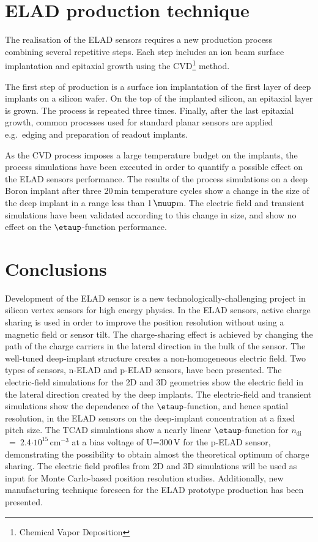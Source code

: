 \documentclass[a4paper,11pt]{article}
\begin{document}
\section{ELAD production technique}
\label{sec:pr}
The realisation of the ELAD sensors requires a new production process combining several repetitive steps.
Each step includes an ion beam surface implantation and epitaxial growth using the CVD\footnote{Chemical Vapor Deposition} method. 

The first step of production is a surface ion implantation of the first layer of deep implants on a silicon wafer.
On the top of the implanted silicon, an epitaxial layer is grown.
The process is repeated three times. 
Finally, after the last epitaxial growth, common processes used for standard planar sensors are applied e.g.\ edging and preparation of readout implants.

As the CVD process imposes a large temperature budget on the implants, the process simulations have been executed in order to quantify a possible effect on the ELAD sensors performance. 
The results of the process simulations on a deep Boron implant after three 20\,min temperature cycles show a change in the size of the deep implant in a range less than 1\,$\muup$m.
The electric field and transient simulations have been validated according to this change in size, and show no effect on the $\etaup$-function performance.


\section{Conclusions}
Development of the ELAD sensor is a new technologically-challenging project in silicon vertex sensors for high energy physics. 
In the ELAD sensors, active charge sharing is used in order to improve the position resolution without using a magnetic field or sensor tilt.
The charge-sharing effect is achieved by changing the path of the charge carriers in the lateral direction in the bulk of the sensor.
The well-tuned deep-implant structure creates a non-homogeneous electric field.
Two types of sensors, n-ELAD and p-ELAD sensors, have been presented.
The electric-field simulations for the 2D and 3D geometries show the electric field in the lateral direction created by the deep implants.
The electric-field and transient simulations show the dependence of the $\etaup$-function, and hence spatial resolution, in the ELAD sensors on the deep-implant concentration at a fixed pitch size.
The TCAD simulations show a nearly linear $\etaup$-function for $n\mathrm{_{di}}$~=~2.4$\mathrm{\cdot10^{15}\,cm^{-3}}$ at a bias voltage of U=300\,V for the p-ELAD sensor,
 demonstrating the possibility to obtain almost the theoretical optimum of charge sharing.
The electric field profiles from 2D and 3D simulations will be used as input for Monte Carlo-based position resolution studies.
Additionally, new manufacturing technique foreseen for the ELAD prototype production has been presented. 
\end{document}
